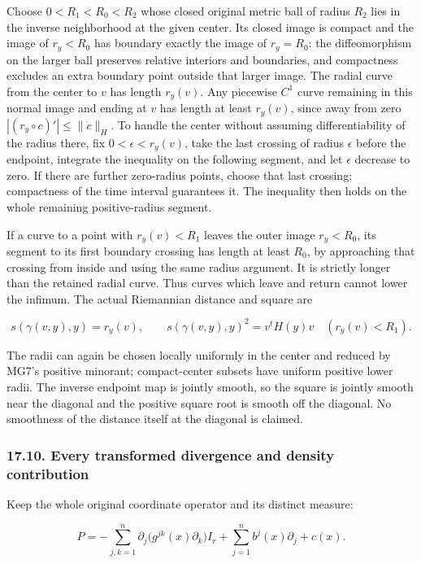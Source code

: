 \documentclass[
  11pt,
]{article}
\begin{document}
Choose \(0<R_1<R_0<R_2\) whose closed original metric ball of radius
\(R_2\) lies in the inverse neighborhood at the given center. Its closed
image is compact and the image of \(r_y<R_0\) has boundary exactly the
image of \(r_y=R_0\): the diffeomorphism on the larger ball preserves
relative interiors and boundaries, and compactness excludes an extra
boundary point outside that larger image. The radial curve from the
center to \(v\) has length \(r_y(v)\). Any piecewise \(C^1\) curve
remaining in this normal image and ending at \(v\) has length at least
\(r_y(v)\), since away from zero \(|(r_y\circ c)'|\leq\|\dot c\|_H\). To
handle the center without assuming differentiability of the radius
there, fix \(0<\epsilon<r_y(v)\), take the last crossing of radius
\(\epsilon\) before the endpoint, integrate the inequality on the
following segment, and let \(\epsilon\) decrease to zero. If there are
further zero-radius points, choose that last crossing; compactness of
the time interval guarantees it. The inequality then holds on the whole
remaining positive-radius segment.

If a curve to a point with \(r_y(v)<R_1\) leaves the outer image
\(r_y<R_0\), its segment to its first boundary crossing has length at
least \(R_0\), by approaching that crossing from inside and using the
same radius argument. It is strictly longer than the retained radial
curve. Thus curves which leave and return cannot lower the infimum. The
actual Riemannian distance and square are

\[
 s(\gamma(v,y),y)=r_y(v),\qquad
 s(\gamma(v,y),y)^2=v^tH(y)v
                     \quad(r_y(v)<R_1).
 \tag{NG6}
\]

The radii can again be chosen locally uniformly in the center and
reduced by MG7's positive minorant; compact-center subsets have uniform
positive lower radii. The inverse endpoint map is jointly smooth, so the
square is jointly smooth near the diagonal and the positive square root
is smooth off the diagonal. No smoothness of the distance itself at the
diagonal is claimed.

\subsubsection{17.10. Every transformed divergence and density
contribution}\label{every-transformed-divergence-and-density-contribution}

Keep the whole original coordinate operator and its distinct measure:

\[
 P=-\sum_{j,k=1}^n\partial_j\bigl(g^{jk}(x)\partial_k\bigr)I_r
       +\sum_{j=1}^n b^j(x)\partial_j+c(x).                    \tag{NG7a}
\]
\end{document}
